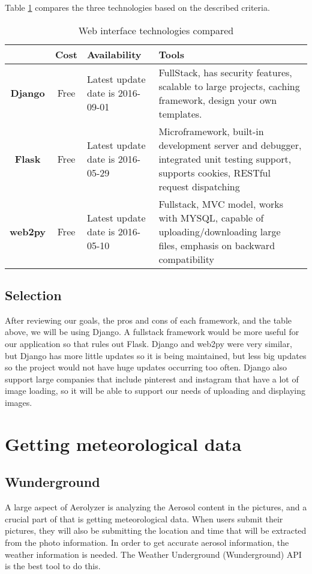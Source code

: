 \documentclass[onecolumn, draftclsnofoot,10pt, compsoc]{IEEEtran}
\begin{document}
\begin{flushleft}
\medskip


Table \ref{table:3} compares the three technologies based on the described criteria. \cite{13} 
\begin{table}[h!]
\caption{Web interface technologies compared}\label{table:3}
\centering
	\begin{tabular}{| c | c |  p{3cm}  |  p{7cm}  |} 
		\hline
		 & Cost & Availability & Tools\\ [0.5ex] 
		\hline
		\textbf{Django} & Free & Latest update date is 2016-09-01 & FullStack, has security features, scalable to large projects, caching framework, design your own templates. \\ 
		\hline
		\textbf{Flask} & Free &  Latest update date is 2016-05-29 & Microframework, built-in development server and debugger, integrated unit testing support, supports cookies, RESTful request dispatching  \\
		\hline
		\textbf{web2py} & Free & Latest update date is 2016-05-10 & Fullstack, MVC model, works with MYSQL, capable of uploading/downloading large files, emphasis on backward compatibility\\
		\hline
	\end{tabular}
\end{table}





\subsection{Selection}
After reviewing our goals, the pros and cons of each framework, and the table above, we will be using Django. A fullstack framework would be more useful for our application so that rules out Flask. Django and web2py were very similar, but Django has more little updates so it is being maintained, but less big updates so the project would not have huge updates occurring too often. Django also support large companies that include pinterest and instagram that have a lot of image loading, so it will be able to support our needs of uploading and displaying images.


\section{Getting meteorological data}

\subsection{Wunderground}
A large aspect of Aerolyzer is analyzing the Aerosol content in the pictures, and a crucial part of that is getting meteorological data. When users submit their pictures, they will also be submitting the location and time that will be extracted from the photo information. In order to get accurate aerosol information, the weather information is needed. The Weather Underground (Wunderground) API is the best tool to do this.




\end{flushleft}
\end{document}
